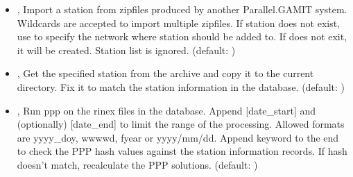 \documentclass[letterpaper,10pt,english]{sphinxmanual}
\begin{document}
\begin{itemize}
\item {} 
\sphinxAtStartPar
{\hyperref[\detokenize{pgamit.com:ScanArchive.py--import}]{}} , {\hyperref[\detokenize{pgamit.com:ScanArchive.py---import_station}]{}}  \sphinxhyphen{} Import a station from zipfiles produced by another Parallel.GAMIT system. Wildcards are accepted to import multiple zipfiles. If station does not exist, use  to specify the network where station should be added to. If  does not exit, it will be created. Station list is ignored. (default: )

\item {} 
\sphinxAtStartPar
{\hyperref[\detokenize{pgamit.com:ScanArchive.py--get}]{}} , {\hyperref[\detokenize{pgamit.com:ScanArchive.py---get_from_archive}]{}}  \sphinxhyphen{} Get the specified station from the archive and copy it to the current directory. Fix it to match the station information in the database. (default: )

\item {} 
\sphinxAtStartPar
{\hyperref[\detokenize{pgamit.com:ScanArchive.py--ppp}]{}} , {\hyperref[\detokenize{pgamit.com:ScanArchive.py---ppp}]{}}  \sphinxhyphen{} Run ppp on the rinex files in the database. Append {[}date\_start{]} and (optionally) {[}date\_end{]} to limit the range of the processing. Allowed formats are yyyy\_doy, wwww\sphinxhyphen{}d, fyear or yyyy/mm/dd. Append keyword  to the end to check the PPP hash values against the station information records. If hash doesn’t match, recalculate the PPP solutions. (default: )


\end{itemize}
\end{document}
